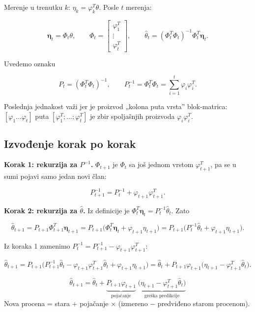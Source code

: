 \documentclass[11pt,a4paper,parskip=half,headsepline,numbers=noenddot]{scrartcl}
\begin{document}
Merenje u trenutku \(k\): \(\eta_k = \varphi_k^T\theta\). Posle \(t\) merenja:

\[\boldsymbol\eta_t = \Phi_t\theta,\qquad \Phi_t = \begin{bmatrix}\varphi_1^T\\ \vdots\\ \varphi_t^T\end{bmatrix},\qquad \hat\theta_t = (\Phi_t^T\Phi_t)^{-1}\Phi_t^T\boldsymbol\eta_t .\]

Uvedemo oznaku

\[P_t = (\Phi_t^T\Phi_t)^{-1},\qquad P_t^{-1} = \Phi_t^T\Phi_t = \sum_{i=1}^t\varphi_i\varphi_i^T .\]

Poslednja jednakost važi jer je proizvod „kolona puta vrsta'' blok-matrica: \([\varphi_1 \dots \varphi_t]\) puta \([\varphi_1^T; \dots; \varphi_t^T]\) je zbir spoljašnjih proizvoda \(\varphi_i\varphi_i^T\).

\subsection{Izvođenje korak po korak}

\textbf{Korak 1: rekurzija za \(P^{-1}\).} \(\Phi_{t+1}\) je \(\Phi_t\) sa još jednom vrstom \(\varphi_{t+1}^T\), pa se u sumi pojavi samo jedan novi član:

\[P_{t+1}^{-1} = P_t^{-1} + \varphi_{t+1}\varphi_{t+1}^T .\]

\textbf{Korak 2: rekurzija za \(\hat\theta\).} Iz definicije je \(\Phi_t^T\boldsymbol\eta_t = P_t^{-1}\hat\theta_t\). Zato

\[\hat\theta_{t+1} = P_{t+1}\Phi_{t+1}^T\boldsymbol\eta_{t+1} = P_{t+1}\big(\Phi_t^T\boldsymbol\eta_t + \varphi_{t+1}\eta_{t+1}\big) = P_{t+1}\big(P_t^{-1}\hat\theta_t + \varphi_{t+1}\eta_{t+1}\big).\]

Iz koraka 1 zamenimo \(P_t^{-1} = P_{t+1}^{-1} - \varphi_{t+1}\varphi_{t+1}^T\):

\[\hat\theta_{t+1} = P_{t+1}\big(P_{t+1}^{-1}\hat\theta_t - \varphi_{t+1}\varphi_{t+1}^T\hat\theta_t + \varphi_{t+1}\eta_{t+1}\big) = \hat\theta_t + P_{t+1}\varphi_{t+1}\big(\eta_{t+1} - \varphi_{t+1}^T\hat\theta_t\big).\]

\begin{kljucna}
\[\hat\theta_{t+1} = \hat\theta_t + \underbrace{P_{t+1}\varphi_{t+1}}_{\text{pojačanje}}\;\underbrace{\big(\eta_{t+1} - \varphi_{t+1}^T\hat\theta_t\big)}_{\text{greška predikcije}}\]
Nova procena = stara + pojačanje × (izmereno − predviđeno starom procenom).
\end{kljucna}
\end{document}
